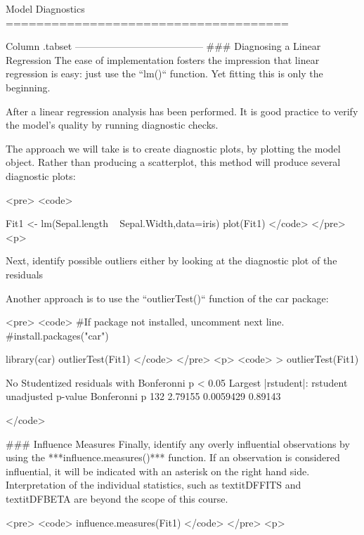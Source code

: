 
Model Diagnostics
=====================================

Column {.tabset}
---------------------------------------
### Diagnosing a Linear Regression
The ease of implementation fosters the impression that linear regression is easy: just use the ``lm()`` function. 
Yet fitting this is only the beginning.

After a linear regression analysis has been performed. It is good practice to verify the model’s quality
by running diagnostic checks.

The approach we will take is to create diagnostic plots, by plotting the model object. Rather than producing a scatterplot, this method will produce several diagnostic plots:

<pre>
<code>

Fit1 <- lm(Sepal.length ~ Sepal.Width,data=iris)
plot(Fit1)
</code> 
</pre>
<p>

Next, identify possible outliers either by looking at the diagnostic plot of the residuals

Another approach is to use the ``outlierTest()`` function of the {car} package:


<pre>
<code>
#If package not installed, uncomment next line.
#install.packages("car")

library(car)
outlierTest(Fit1)
</code> 
</pre>
<p>
<code>
> outlierTest(Fit1)

No Studentized residuals with Bonferonni p < 0.05
Largest |rstudent|:
    rstudent unadjusted p-value Bonferonni p
132  2.79155          0.0059429      0.89143

</code>


### Influence Measures
Finally, identify any overly influential observations by using the ***influence.measures()***
function.
If an observation is considered influential, it will be indicated with an asterisk on the right hand side. Interpretation of the individual statistics, such as textit{DFFITS} and textit{DFBETA} are beyond the scope of this course.

<pre>
<code>
influence.measures(Fit1)
</code> 
</pre>
<p>
